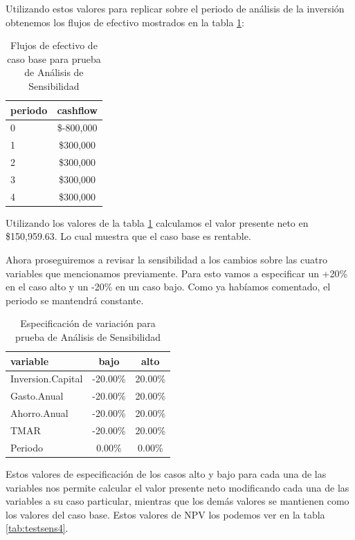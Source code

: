 \documentclass[
]{book}
\begin{document}
Utilizando estos valores para replicar sobre el periodo de análisis de
la inversión obtenemos los flujos de efectivo mostrados en la tabla
\ref{tab:testsens2}:

\begin{table}

\caption{\label{tab:testsens2}Flujos de efectivo de caso base para prueba de Análisis de Sensibilidad}
\centering
\begin{tabular}[t]{l|c}
\hline
periodo & cashflow\\
\hline
0 & \$-800,000\\
\hline
1 & \$300,000\\
\hline
2 & \$300,000\\
\hline
3 & \$300,000\\
\hline
4 & \$300,000\\
\hline
\end{tabular}
\end{table}

Utilizando los valores de la tabla \ref{tab:testsens2} calculamos el
valor presente neto en \$150,959.63. Lo cual muestra que el caso base
es rentable.

Ahora proseguiremos a revisar la sensibilidad a los cambios sobre las
cuatro variables que mencionamos previamente. Para esto vamos a
especificar un +20\% en el caso alto y un -20\% en un caso bajo. Como ya
habíamos comentado, el periodo se mantendrá constante.

\begin{table}

\caption{\label{tab:testsens3}Especificación de variación para prueba de Análisis de Sensibilidad}
\centering
\begin{tabular}[t]{l|c|c}
\hline
variable & bajo & alto\\
\hline
Inversion.Capital & -20.00\% & 20.00\%\\
\hline
Gasto.Anual & -20.00\% & 20.00\%\\
\hline
Ahorro.Anual & -20.00\% & 20.00\%\\
\hline
TMAR & -20.00\% & 20.00\%\\
\hline
Periodo & 0.00\% & 0.00\%\\
\hline
\end{tabular}
\end{table}

Estos valores de especificación de los casos alto y bajo para cada una
de las variables nos permite calcular el valor presente neto modificando
cada una de las variables a su caso particular, mientras que los demás
valores se mantienen como los valores del caso base. Estos valores de
NPV los podemos ver en la tabla \ref{tab:testsens4}.
\end{document}

